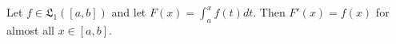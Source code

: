 Let $f \in \mathfrak{L}_1([a, b])$ and let $F(x) = \int_a^x f(t) dt$. Then $F'(x) = f(x)$ for almost all $x \in [a, b]$.
